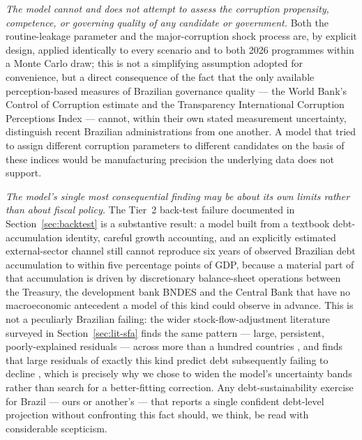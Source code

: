 \documentclass[11pt,a4paper]{article}
\begin{document}
\emph{The model cannot and does not attempt to assess the corruption propensity, competence, or governing quality of any candidate or government.} Both the routine-leakage parameter and the major-corruption shock process are, by explicit design, applied identically to every scenario and to both 2026 programmes within a Monte Carlo draw; this is not a simplifying assumption adopted for convenience, but a direct consequence of the fact that the only available perception-based measures of Brazilian governance quality --- the World Bank's Control of Corruption estimate and the Transparency International Corruption Perceptions Index --- cannot, within their own stated measurement uncertainty, distinguish recent Brazilian administrations from one another. A model that tried to assign different corruption parameters to different candidates on the basis of these indices would be manufacturing precision the underlying data does not support.

\emph{The model's single most consequential finding may be about its own limits rather than about fiscal policy.} The Tier~2 back-test failure documented in Section~\ref{sec:backtest} is a substantive result: a model built from a textbook debt-accumulation identity, careful growth accounting, and an explicitly estimated external-sector channel still cannot reproduce six years of observed Brazilian debt accumulation to within five percentage points of GDP, because a material part of that accumulation is driven by discretionary balance-sheet operations between the Treasury, the development bank BNDES and the Central Bank that have no macroeconomic antecedent a model of this kind could observe in advance. This is not a peculiarly Brazilian failing: the wider stock-flow-adjustment literature surveyed in Section~\ref{sec:lit-sfa} finds the same pattern --- large, persistent, poorly-explained residuals --- across more than a hundred countries \citep{weber2012sfa}, and finds that large residuals of exactly this kind predict debt subsequently failing to decline \citep{jaramilloetal2017}, which is precisely why we chose to widen the model's uncertainty bands rather than search for a better-fitting correction. Any debt-sustainability exercise for Brazil --- ours or another's --- that reports a single confident debt-level projection without confronting this fact should, we think, be read with considerable scepticism.
\end{document}
